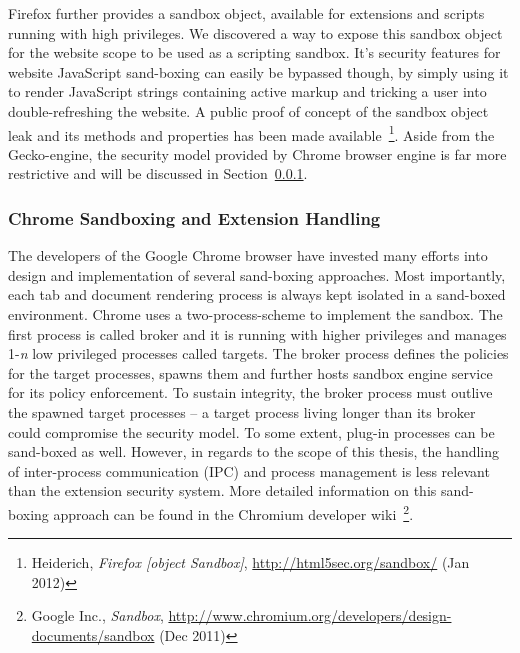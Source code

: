      Firefox further provides a sandbox object, available for extensions and scripts running with high privileges. We discovered a way to expose this sandbox object for the website scope to be used as a scripting sandbox. It's security features for website JavaScript sand-boxing can easily be bypassed though, by simply using it to render JavaScript strings containing active markup and tricking a user into double-refreshing the website. A public proof of concept of the sandbox object leak and its methods and properties has been made available~\footnote{Heiderich, \textit{Firefox [object Sandbox]}, \url{http://html5sec.org/sandbox/} (Jan 2012)}. Aside from the Gecko-engine, the security model provided by Chrome browser engine is far more restrictive and will be discussed in Section~\ref{subsubsubsec:2.4.1.5.webkit_and_chrome_security_extensions}. 

      \subsubsection{Chrome Sandboxing and Extension Handling}
      \label{subsubsubsec:2.4.1.5.webkit_and_chrome_security_extensions}

      The developers of the Google Chrome browser have invested many efforts into design and implementation of several sand-boxing approaches. Most importantly, each tab and document rendering process is always kept isolated in a sand-boxed environment. Chrome uses a two-process-scheme to implement the sandbox. The first process is called broker and it is running with higher privileges and manages 1-\textit{n} low privileged processes called targets. The broker process defines the policies for the target processes, spawns them and further hosts sandbox engine service for its policy enforcement. To sustain integrity, the broker process must outlive the spawned target processes -- a target process living longer than its broker could compromise the security model. To some extent, plug-in processes can be sand-boxed as well. However, in regards to the scope of this thesis, the handling of inter-process communication (IPC) and process management is less relevant than the extension security system. More detailed 
information on this sand-boxing approach can be found in the Chromium developer wiki~\footnote{Google Inc., \textit{Sandbox}, \url{http://www.chromium.org/developers/design-documents/sandbox} (Dec 2011)}.\\

